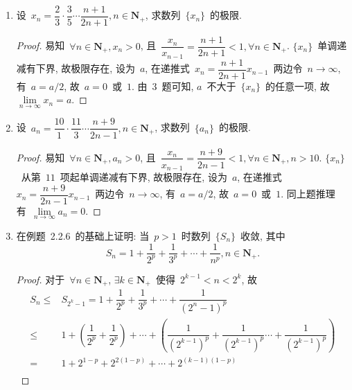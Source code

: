 \documentclass[UTF8,a4paper,10pt,twoside]{book}
\begin{document}
\begin{enumerate}
\begin{proof}
		      设~$\{y_n\}$~是单调减少有下界的数列, 则~$\{-y_n\}$~是单调增加有上界的数列, 由单调有界原理, 若~$\lim\limits_{n\to\infty} y_n=b$, 则~$\lim\limits_{n\to\infty} -y_n=-b$. 由前可知, $\forall n\in\mathbf{N}_{+}, -y_n\leqslant-b$, 即~$\forall n\in\mathbf{N}_{+}, y_n\geqslant b$.\qedhere
	      \end{proof}
	\item 设~$x_n=\dfrac{2}{3}\cdot\dfrac{3}{5}\cdots\dfrac{n+1}{2n+1}, n\in\mathbf{N}_{+}$, 求数列~$\{x_n\}$~的极限.
	      \begin{proof}
		      易知~$\forall n\in\mathbf{N}_{+}, x_n>0$, 且~$\dfrac{x_n}{x_{n-1}}=\dfrac{n+1}{2n+1}<1, \forall n\in\mathbf{N}_{+}$. $\{x_n\}$~单调递减有下界, 故极限存在, 设为~$a$, 在递推式~$x_n=\dfrac{n+1}{2n+1}x_{n-1}$~两边令~$n\to\infty$, 有~$a=a/2$, 故~$a=0$~或~$1$. 由~3~题可知, $a$~不大于~$\{x_n\}$~的任意一项, 故~$\lim\limits_{n\to\infty} x_n=a$.\qedhere
	      \end{proof}
	\item 设~$a_n=\dfrac{10}{1}\cdot\dfrac{11}{3}\cdots\dfrac{n+9}{2n-1}, n\in\mathbf{N}_{+}$, 求数列~$\{a_n\}$~的极限.
	      \begin{proof}
		      易知~$\forall n\in\mathbf{N}_{+}, a_n>0$, 且~$\dfrac{x_n}{x_{n-1}}=\dfrac{n+9}{2n-1}<1, \forall n\in\mathbf{N}_{+}, n>10$. $\{x_n\}$~从第~$11$~项起单调递减有下界, 故极限存在, 设为~$a$, 在递推式~$x_n=\dfrac{n+9}{2n-1}x_{n-1}$~两边令~$n\to\infty$, 有~$a=a/2$, 故~$a=0$~或~$1$. 同上题推理有~$\lim\limits_{n\to\infty} a_n=0$.\qedhere
	      \end{proof}
	\item 在例题~2.2.6~的基础上证明: 当~$p>1$~时数列~$\{S_n\}$~收敛, 其中
	      \[
		      S_n=1+\dfrac{1}{2^p}+\dfrac{1}{3^p}+\cdots+\dfrac{1}{n^p}, n\in\mathbf{N}_{+}.
	      \]
	      \begin{proof}
		      对于~$\forall n\in\mathbf{N}_{+}$, $\exists k\in\mathbf{N}_{+}$~使得~$2^{k-1}<n<2^{k}$, 故
		      \begin{equation*}
			      \begin{split}
				      S_n\leqslant & S_{2^k-1}=1+\dfrac{1}{2^p}+\dfrac{1}{3^p}+\cdots+\dfrac{1}{(2^n-1)^p}                                                                                         \\
				      \leqslant        & 1+\left(\dfrac{1}{2^p}+\dfrac{1}{2^p}\right)+\cdots+\left(\dfrac{1}{(2^{k-1})^p}+\dfrac{1}{(2^{k-1})^p}\cdots+\dfrac{1}{(2^{k-1})^p}\right) \\
				      =                & 1+2^{1-p}+2^{2(1-p)}+\cdots+2^{(k-1)(1-p)}                                                                                                    \\

\end{split}
\end{equation*}
\end{proof}
\end{enumerate}
\end{document}
